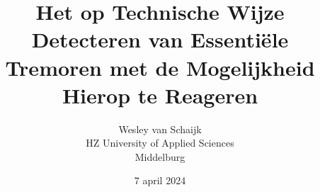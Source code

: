 \documentclass{article}
\title{Het op Technische Wijze Detecteren van Essentiële Tremoren met de Mogelijkheid Hierop te Reageren}
\author{Wesley van Schaijk \\ HZ University of Applied Sciences \\ Middelburg}
\date{7 april 2024}
\begin{document}
\maketitle



\tableofcontents

\newpage
\begin{multicols}{2}
    
    
    
    
    
    
    
\end{multicols}



{
    \raggedright
    
    
}

\newpage

\end{document}
